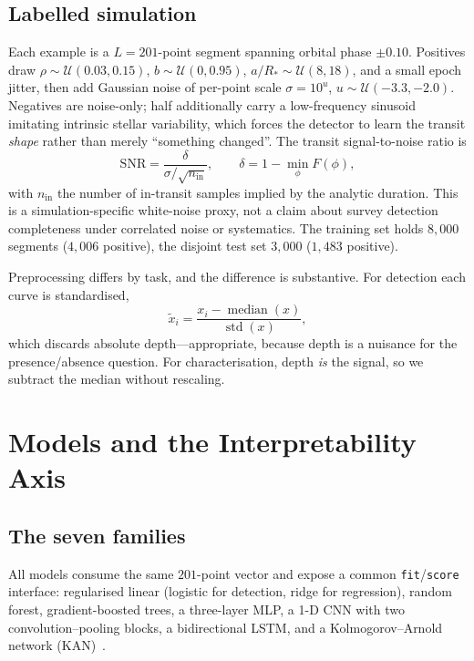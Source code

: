 \documentclass[manuscript,nonacm]{acmart}
\begin{document}
\subsection{Labelled simulation}
Each example is a $L=201$-point segment spanning orbital phase $\pm0.10$. Positives draw
$\rho\sim\mathcal{U}(0.03,0.15)$, $b\sim\mathcal{U}(0,0.95)$,
$a/R_*\sim\mathcal{U}(8,18)$, and a small epoch jitter, then add Gaussian noise of
per-point scale $\sigma=10^{u}$, $u\sim\mathcal{U}(-3.3,-2.0)$. Negatives are
noise-only; half additionally carry a low-frequency sinusoid imitating intrinsic stellar
variability, which forces the detector to learn the transit \emph{shape} rather than
merely ``something changed''. The transit signal-to-noise ratio is
\begin{equation}
\mathrm{SNR}=\frac{\delta}{\sigma/\sqrt{n_{\mathrm{in}}}},
\qquad \delta = 1-\min_\phi F(\phi),
\label{eq:snr}
\end{equation}
with $n_{\mathrm{in}}$ the number of in-transit samples implied by the analytic
duration. This is a simulation-specific white-noise proxy, not a claim about survey
detection completeness under correlated noise or systematics. The training set holds
$8{,}000$ segments ($4{,}006$ positive), the disjoint
test set $3{,}000$ ($1{,}483$ positive).

Preprocessing differs by task, and the difference is substantive. For detection each
curve is standardised,
\begin{equation}
\tilde{x}_i=\frac{x_i-\operatorname{median}(x)}{\operatorname{std}(x)},
\label{eq:standardise}
\end{equation}
which discards absolute depth---appropriate, because depth is a nuisance for the
presence/absence question. For characterisation, depth \emph{is} the signal, so we
subtract the median without rescaling.

\section{Models and the Interpretability Axis}

\subsection{The seven families}
All models consume the same $201$-point vector and expose a common
\texttt{fit}/\texttt{score} interface: regularised linear (logistic for detection, ridge
for regression), random forest, gradient-boosted trees, a three-layer MLP, a 1-D CNN
with two convolution--pooling blocks, a bidirectional LSTM, and a Kolmogorov--Arnold
network (KAN)~\cite{liu2024kan}.
\end{document}
